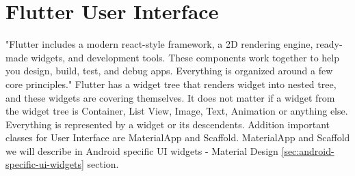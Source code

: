 \section{Flutter User Interface}\label{subsec:flutter-user-interface}
"Flutter includes a modern react-style framework, a 2D rendering engine, ready-made widgets, and development tools.
These components work together to help you design, build, test, and debug apps.
Everything is organized around a few core principles."\cite{flutterTechnicalOverview}
Flutter has a widget tree that renders widget into nested tree, and these widgets are covering themselves.
It does not matter if a widget from the widget tree is Container, List View, Image, Text, Animation or anything else.
Everything is represented by a widget or its descendents.
Addition important classes for User Interface are MaterialApp and Scaffold.
MaterialApp and Scaffold we will describe in Android specific UI widgets - Material Design \ref{sec:android-specific-ui-widgets} section.
